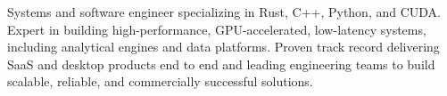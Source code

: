 

\begin{cvparagraph}

Systems and software engineer specializing in Rust, C++, Python, and CUDA.
Expert in building high-performance, GPU-accelerated, low-latency systems, including analytical engines and data platforms.
Proven track record delivering SaaS and desktop products end to end and leading engineering teams to build scalable, reliable,
and commercially successful solutions.
\end{cvparagraph}
